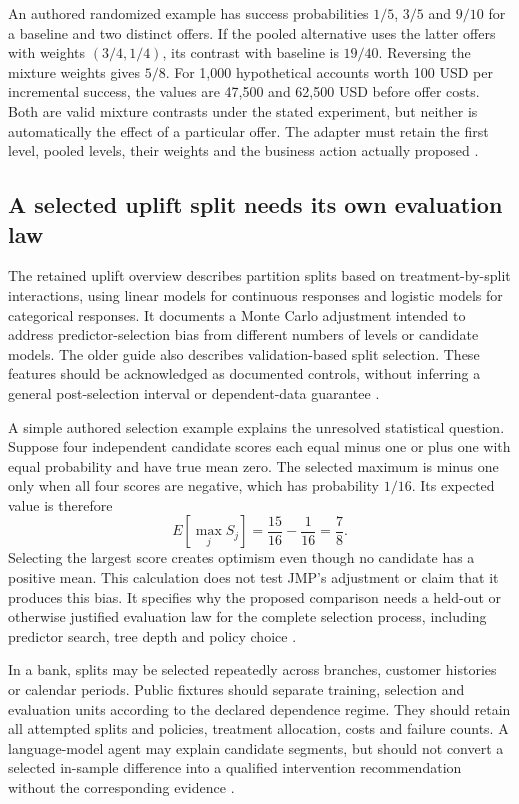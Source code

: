 An authored randomized example has success probabilities $1/5$, $3/5$
and $9/10$ for a baseline and two distinct offers. If the pooled alternative
uses the latter offers with weights $(3/4,1/4)$, its contrast with baseline
is $19/40$. Reversing the mixture weights gives $5/8$. For 1,000
hypothetical accounts worth 100 USD per incremental success, the values
are 47,500 and 62,500 USD before offer costs. Both are valid mixture
contrasts under the stated experiment, but neither is automatically the
effect of a particular offer. The adapter must retain the first level,
pooled levels, their weights and the business action actually proposed
\citep{exec24_jmp_choice}.

\subsection{A selected uplift split needs its own evaluation law}
The retained uplift overview describes partition splits based on
treatment-by-split interactions, using linear models for continuous
responses and logistic models for categorical responses. It documents a
Monte Carlo adjustment intended to address predictor-selection bias from
different numbers of levels or candidate models. The older guide also
describes validation-based split selection. These features should be
acknowledged as documented controls, without inferring a general
post-selection interval or dependent-data guarantee
\citep{exec13_ch_jmp_uplift}.

A simple authored selection example explains the unresolved statistical
question. Suppose four independent candidate scores each equal minus one
or plus one with equal probability and have true mean zero. The selected
maximum is minus one only when all four scores are negative, which has
probability $1/16$. Its expected value is therefore
\[
 E[\max_j S_j]=\frac{15}{16}-\frac1{16}=\frac78.
\]
Selecting the largest score creates optimism even though no candidate
has a positive mean. This calculation does not test JMP's adjustment or
claim that it produces this bias. It specifies why the proposed comparison
needs a held-out or otherwise justified evaluation law for the complete
selection process, including predictor search, tree depth and policy choice
\citep{exec24_jmp_choice}.

In a bank, splits may be selected repeatedly across branches, customer
histories or calendar periods. Public fixtures should separate training,
selection and evaluation units according to the declared dependence regime.
They should retain all attempted splits and policies, treatment allocation,
costs and failure counts. A language-model agent may explain candidate
segments, but should not convert a selected in-sample difference into a
qualified intervention recommendation without the corresponding evidence
\citep{exec24_jmp_choice}.

